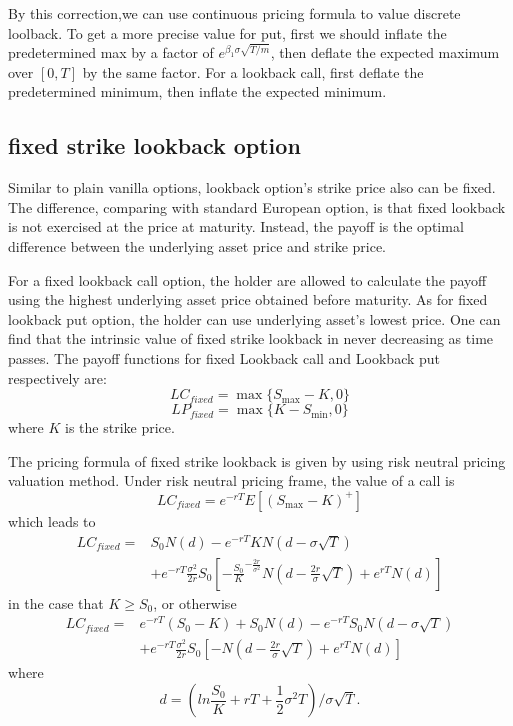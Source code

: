 \documentclass[11pt]{book}
\begin{document}
By this correction,we can use continuous pricing formula
to value discrete loolback. To get a more precise value for put,
first we should inflate the predetermined max by a factor of
$e^{\beta_1 \sigma \sqrt{T/m}}$,
then deflate the expected maximum over $[0,T]$ by the same factor. For a lookback call, first deflate the predetermined minimum, then inflate the expected minimum.




\subsection{fixed strike lookback option}
Similar to plain vanilla options, lookback option's strike price also can be fixed. The difference, comparing with standard European option, is that fixed lookback is not exercised at the price at maturity.  Instead, the payoff is the optimal difference between the underlying asset price and strike price. 

For a fixed lookback call option, the holder are allowed to calculate the payoff using the highest underlying asset price obtained before maturity. As for fixed lookback put option, the holder can use underlying asset's lowest price. One can find that the intrinsic value of fixed strike lookback in never decreasing as time passes. The payoff functions for fixed Lookback call and  Lookback put respectively are:
\begin{equation}
LC_{fixed} = \max\{S_{\max} - K, 0\} 
\end{equation}
\begin{equation}
LP_{fixed}= \max\{K-S_{\min},0\}
\end{equation}
where $K$ is the strike price.

The pricing formula of fixed strike lookback is given by \cite{Conze1991} using risk neutral pricing valuation method. Under risk neutral pricing frame, the value of a call is 
\begin{equation}
LC_{fixed} = e^{-rT}E[(S_{\max}-K)^{+}]
\end{equation}
which leads to 
\begin{equation}
\begin{split}
LC_{fixed} =& S_0 N(d) - e^{-rT}KN(d-\sigma \sqrt{T}) \\
&+ e^{-rT} \frac{\sigma^2}{2r} S_0 [ -{\frac{S_0}{K}}^{-\frac{2r}{\sigma^2}} N(d-\frac{2r}{\sigma}\sqrt{T}) + e^{rT}N(d)] 
\end{split}
\end{equation}
in the case that $K\geq S_0$, or otherwise
\begin{equation}
\begin{split}
LC_{fixed} = & e^{-rT}(S_0 - K) + S_0 N(d) - e^{-rT}S_0 N(d-\sigma \sqrt{T}) \\
&+ e^{-rT} \frac{\sigma ^2}{2r} S_0 [ -N(d-\frac{2r}{\sigma}\sqrt{T}) + e^{rT}N(d)]
\end{split}
\end{equation}
where
\begin{equation}
d = ( ln\frac{S_0}{K} + rT + \frac{1}{2} \sigma^2 T)/ {\sigma \sqrt{T}}.
\end{equation}
\end{document}
